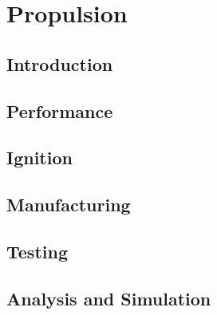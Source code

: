 \section{Propulsion}
\subsection{Introduction}
\subsection{Performance}
\subsection{Ignition}
\subsection{Manufacturing}
\subsection{Testing}
\subsection{Analysis and Simulation}